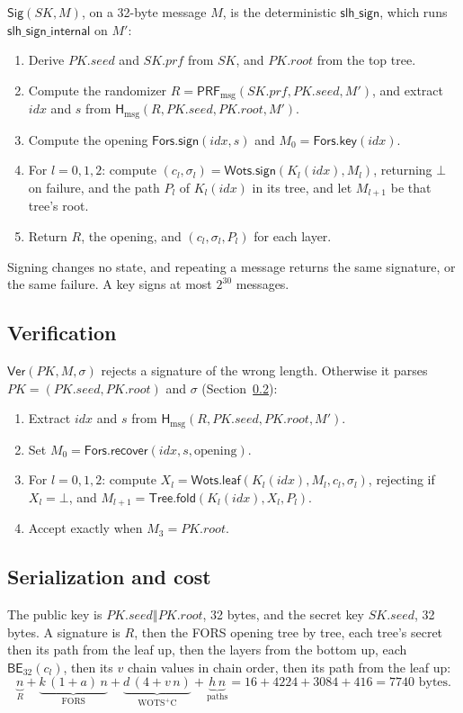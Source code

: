 \documentclass[11pt]{article}
\newcommand{\PRFmsg}{\mathsf{PRF}_{\mathrm{msg}}}
\newcommand{\Hmsg}{\mathsf{H}_{\mathrm{msg}}}
\newcommand{\Sig}{\mathsf{Sig}}
\newcommand{\Ver}{\mathsf{Ver}}
\newcommand{\BE}{\mathsf{BE}}
\newcommand{\concat}{\mathbin\Vert}
\newcommand{\PK}{\mathit{PK}}
\newcommand{\SK}{\mathit{SK}}
\newcommand{\pkseed}{\mathit{PK.seed}}
\newcommand{\pkroot}{\mathit{PK.root}}
\newcommand{\skseed}{\mathit{SK.seed}}
\newcommand{\skprf}{\mathit{SK.prf}}
\newcommand{\idx}{\mathit{idx}}
\newcommand{\WotsSign}{\mathsf{Wots.sign}}
\newcommand{\WotsLeaf}{\mathsf{Wots.leaf}}
\newcommand{\TreeFold}{\mathsf{Tree.fold}}
\newcommand{\ForsKey}{\mathsf{Fors.key}}
\newcommand{\ForsSign}{\mathsf{Fors.sign}}
\newcommand{\ForsRec}{\mathsf{Fors.recover}}
\begin{document}
$\Sig(\SK,M)$, on a 32-byte message $M$, is the deterministic $\mathsf{slh\_sign}$, which runs $\mathsf{slh\_sign\_internal}$ on $M'$:
\begin{enumerate}
\item Derive $\pkseed$ and $\skprf$ from $\SK$, and $\pkroot$ from the top tree.
\item Compute the randomizer $R=\PRFmsg(\skprf,\pkseed,M')$, and extract $\idx$ and $s$ from $\Hmsg(R,\pkseed,\pkroot,M')$.
\item Compute the opening $\ForsSign(\idx,s)$ and $M_0=\ForsKey(\idx)$.
\item For $l=0,1,2$: compute $(c_l,\sigma_l)=\WotsSign(K_l(\idx),M_l)$, returning $\bot$ on failure, and the path $P_l$ of $K_l(\idx)$ in its tree, and let $M_{l+1}$ be that tree's root.
\item Return $R$, the opening, and $(c_l,\sigma_l,P_l)$ for each layer.
\end{enumerate}
Signing changes no state, and repeating a message returns the same signature, or the same failure. A key signs at most $2^{30}$ messages.

\subsection{Verification}

$\Ver(\PK,M,\sigma)$ rejects a signature of the wrong length. Otherwise it parses $\PK=(\pkseed,\pkroot)$ and $\sigma$ (Section~\ref{sec:costs}):
\begin{enumerate}
\item Extract $\idx$ and $s$ from $\Hmsg(R,\pkseed,\pkroot,M')$.
\item Set $M_0=\ForsRec(\idx,s,\text{opening})$.
\item For $l=0,1,2$: compute $X_l=\WotsLeaf(K_l(\idx),M_l,c_l,\sigma_l)$, rejecting if $X_l=\bot$, and $M_{l+1}=\TreeFold(K_l(\idx),X_l,P_l)$.
\item Accept exactly when $M_3=\pkroot$.
\end{enumerate}

\subsection{Serialization and cost}
\label{sec:costs}

The public key is $\pkseed\concat\pkroot$, 32 bytes, and the secret key $\skseed$, 32 bytes. A signature is $R$, then the FORS opening tree by tree, each tree's secret then its path from the leaf up, then the layers from the bottom up, each $\BE_{32}(c_l)$, then its $v$ chain values in chain order, then its path from the leaf up:
\[
  \underbrace{n}_{R}
  +\underbrace{k\,(1+a)\,n}_{\text{FORS}}
  +\underbrace{d\,(4+v\,n)}_{\text{WOTS$^+$C}}
  +\underbrace{h\,n}_{\text{paths}}
  =16+4224+3084+416=7740\text{ bytes}.
\]
\end{document}
